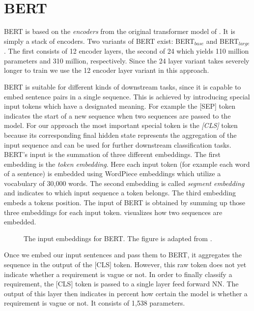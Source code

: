 \section{BERT}
\label{chp:approach:sec:BERT}

\Ac{BERT} is based on the \textit{encoders} from the original transformer model of \textcite{Vaswani:2017}.
It is simply a stack of encoders.
Two variants of \ac{BERT} exist: \ac{BERT}$_{base}$ and \ac{BERT}$_{large}$.
The first consists of 12 encoder layers, the second of 24 which yields 110 million parameters and 310 million, respectively.
Since the 24 layer variant takes severely longer to train we use the 12 encoder layer variant in this approach. \parencite{Devlin:2018}

\Ac{BERT} is suitable for different kinds of downstream tasks, since it is capable to embed sentence pairs in a single sequence.
This is achieved by introducing special input tokens which have a designated meaning.
For example the [SEP] token indicates the start of a new sequence when two sequences are passed to the model.
For our approach the most important special token is the \textit{[CLS]} token because its corresponding final hidden state represents the aggregation of the input sequence and can be used for further downstream classification tasks.
\Ac{BERT}'s input is the summation of three different embeddings.
The first embedding is the \textit{token embedding}.
Here each input token (for example each word of a sentence) is embedded using WordPiece embeddings \parencite{Wu:2016} which utilize a vocabulary of 30,000 words.
The second embedding is called \textit{segment embedding} and indicates to which input sequence a token belongs.
The third embedding embeds a tokens position.
The input of \ac{BERT} is obtained by summing up those three embeddings for each input token.
 visualizes how two sequences are embedded. \parencite{Devlin:2018}
\begin{figure}[htpb]
    \centering
    \def\svgwidth{\columnwidth}
    \scalebox{1.07}{}
    \caption[BERT Input Embeddings]{The input embeddings for \ac{BERT}. The figure is adapted from \textcite{Devlin:2018}.}\label{fig:approach:BERT:input_embedding}
\end{figure}

Once we embed our input sentences and pass them to \ac{BERT}, it aggregates the sequence in the output of the [CLS] token.
However, this raw token does not yet indicate whether a requirement is vague or not.
In order to finally classify a requirement, the [CLS] token is passed to a single layer feed forward \ac{NN}.
The output of this layer then indicates in percent how certain the model is whether a requirement is vague or not.
It consists of 1,538 parameters.
